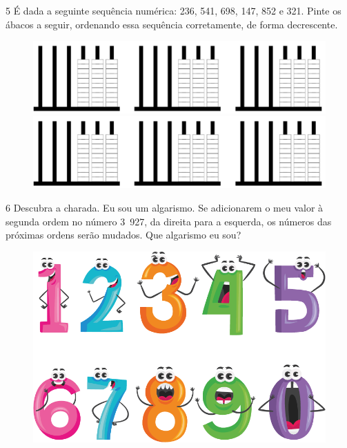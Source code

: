 

\num{5} É dada a seguinte sequência numérica: 236, 541, 698, 147, 852 e 321. Pinte os
ábacos a seguir, ordenando essa sequência corretamente, de forma
decrescente.

\begin{figure}[htpb!]
\includegraphics[width=\textwidth]{./media/image7b.png}
\includegraphics[width=\textwidth]{./media/image7b.png}
\end{figure}

\pagebreak


\num{6} Descubra a charada. Eu sou um algarismo. Se adicionarem o meu valor à
segunda ordem no número 3~927, da direita para a esquerda, os números das próximas
ordens serão mudados. Que algarismo eu sou?


\begin{figure}[htpb!]
\includegraphics[width=\textwidth]{./media/image8.png}
\end{figure}


